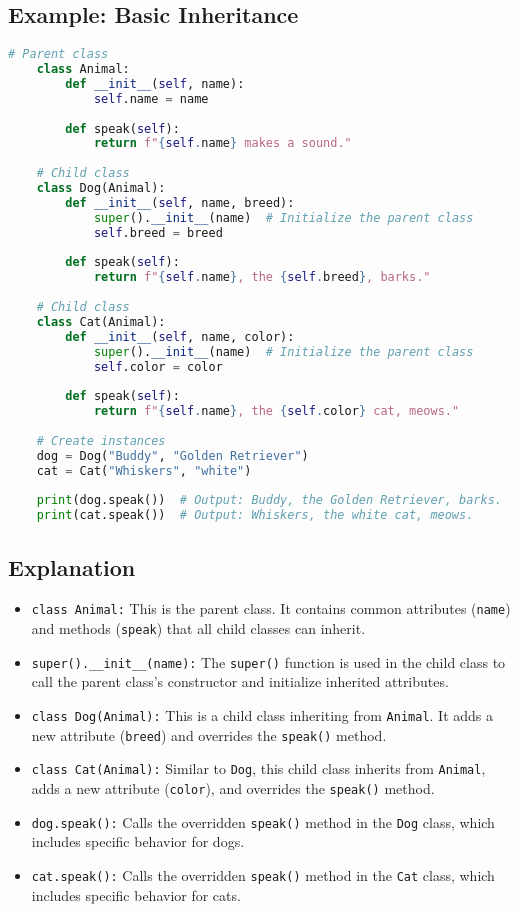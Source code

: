 \subsection{Example: Basic Inheritance}
\begin{lstlisting}[language=python, caption={Inheritance Example}]
	# Parent class
	class Animal:
		def __init__(self, name):
			self.name = name
	
		def speak(self):
			return f"{self.name} makes a sound."
	
	# Child class
	class Dog(Animal):
		def __init__(self, name, breed):
			super().__init__(name)  # Initialize the parent class
			self.breed = breed
	
		def speak(self):
			return f"{self.name}, the {self.breed}, barks."
	
	# Child class
	class Cat(Animal):
		def __init__(self, name, color):
			super().__init__(name)  # Initialize the parent class
			self.color = color
		
		def speak(self):
			return f"{self.name}, the {self.color} cat, meows."
	
	# Create instances
	dog = Dog("Buddy", "Golden Retriever")
	cat = Cat("Whiskers", "white")
	
	print(dog.speak())  # Output: Buddy, the Golden Retriever, barks.
	print(cat.speak())  # Output: Whiskers, the white cat, meows.
\end{lstlisting}

\subsection{Explanation}
\begin{itemize}
	\item \texttt{class Animal:} This is the parent class. It contains common attributes (\texttt{name}) and methods (\texttt{speak}) that all child classes can inherit.
	\item \texttt{super().\_\_init\_\_(name):} The \texttt{super()} function is used in the child class to call the parent class's constructor and initialize inherited attributes.
	\item \texttt{class Dog(Animal):} This is a child class inheriting from \texttt{Animal}. It adds a new attribute (\texttt{breed}) and overrides the \texttt{speak()} method.
	\item \texttt{class Cat(Animal):} Similar to \texttt{Dog}, this child class inherits from \texttt{Animal}, adds a new attribute (\texttt{color}), and overrides the \texttt{speak()} method.
	\item \texttt{dog.speak():} Calls the overridden \texttt{speak()} method in the \texttt{Dog} class, which includes specific behavior for dogs.
	\item \texttt{cat.speak():} Calls the overridden \texttt{speak()} method in the \texttt{Cat} class, which includes specific behavior for cats.
\end{itemize}






